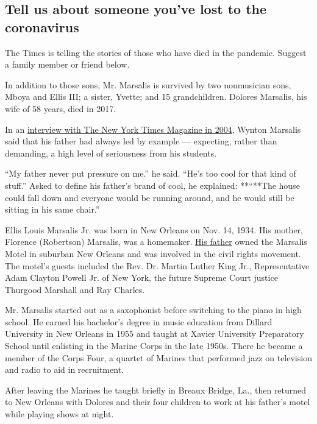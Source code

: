 \hypertarget{tell-us-about-someone-youve-lost-to-the-coronavirus}{%
\subsection{Tell us about someone you've lost to the
coronavirus}\label{tell-us-about-someone-youve-lost-to-the-coronavirus}}

The Times is telling the stories of those who have died in the pandemic.
Suggest a family member or friend below.

In addition to those sons, Mr. Marsalis is survived by two nonmusician
sons, Mboya and Ellis III; a sister, Yvette; and 15 grandchildren.
Dolores Marsalis, his wife of 58 years, died in 2017.

In an
\href{https://www.nytimes3xbfgragh.onion/2004/10/03/magazine/the-music-man.html}{interview
with The New York Times Magazine in 2004}, Wynton Marsalis said that his
father had always led by example --- expecting, rather than demanding, a
high level of seriousness from his students.

``My father never put pressure on me.'' he said. ``He's too cool for
that kind of stuff.'' Asked to define his father's brand of cool, he
explained: **``**The house could fall down and everyone would be running
around, and he would still be sitting in his same chair.''

Ellis Louis Marsalis Jr. was born in New Orleans on Nov. 14, 1934. His
mother, Florence (Robertson) Marsalis, was a homemaker.
\href{https://www.nytimes3xbfgragh.onion/2004/09/24/arts/music/ellis-marsalis-sr-96-jazzmens-patriarch-dies.html}{His
father} owned the Marsalis Motel in suburban New Orleans and was
involved in the civil rights movement. The motel's guests included the
Rev. Dr. Martin Luther King Jr., Representative Adam Clayton Powell Jr.
of New York, the future Supreme Court justice Thurgood Marshall and Ray
Charles.

Mr. Marsalis started out as a saxophonist before switching to the piano
in high school. He earned his bachelor's degree in music education from
Dillard University in New Orleans in 1955 and taught at Xavier
University Preparatory School until enlisting in the Marine Corps in the
late 1950s. There he became a member of the Corps Four, a quartet of
Marines that performed jazz on television and radio to aid in
recruitment.

After leaving the Marines he taught briefly in Breaux Bridge, La., then
returned to New Orleans with Dolores and their four children to work at
his father's motel while playing shows at night.

